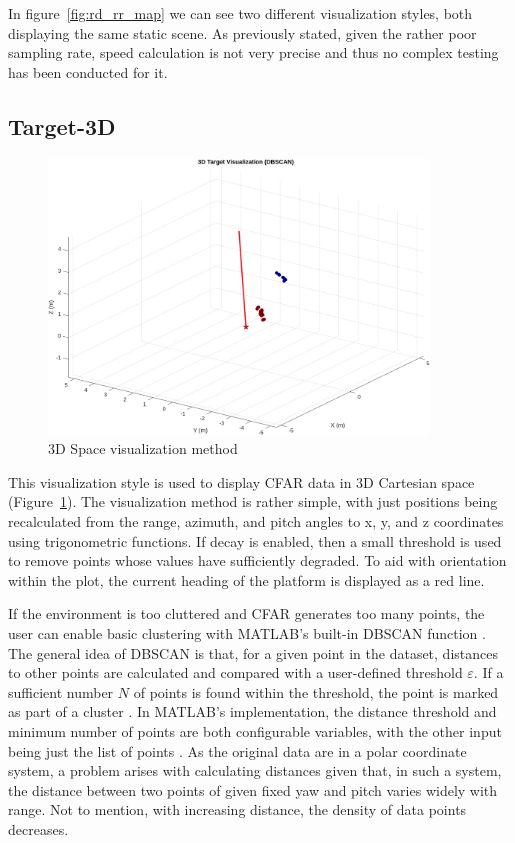 In figure~\ref{fig:rd_rr_map} we can see two different visualization styles, both displaying the same static scene.
As previously stated, given the rather poor sampling rate, speed calculation is not very precise and thus no complex testing has been conducted for it.

\subsection{Target-3D}

\begin{figure}[h!]
	\centering
	\includegraphics[width=0.9\textwidth]{../img/vis_3d.jpg}
	\caption[3D Space visualization method]{3D Space visualization method}
	\label{fig:vis3d}
\end{figure}

This visualization style is used to display CFAR data in 3D Cartesian space (Figure~\ref{fig:vis3d}).
The visualization method is rather simple, with just positions being recalculated from the range, azimuth, and pitch angles to x, y, and z coordinates using trigonometric functions.
If decay is enabled, then a small threshold is used to remove points whose values have sufficiently degraded.
To aid with orientation within the plot, the current heading of the platform is displayed as a red line.

If the environment is too cluttered and CFAR generates too many points, the user can enable basic clustering with MATLAB's built-in DBSCAN function \cite{matlab_dbscan}.
The general idea of DBSCAN is that, for a given point in the dataset, distances to other points are calculated and compared with a user-defined threshold $\varepsilon$.
If a sufficient number $N$ of points is found within the threshold, the point is marked as part of a cluster \cite{Kellner2012}.
In MATLAB's implementation, the distance threshold and minimum number of points are both configurable variables, with the other input being just the list of points \cite{matlab_dbscan}.
As the original data are in a polar coordinate system, a problem arises with calculating distances given that, in such a system, the distance between two points of given fixed yaw and pitch varies widely with range.
Not to mention, with increasing distance, the density of data points decreases.

